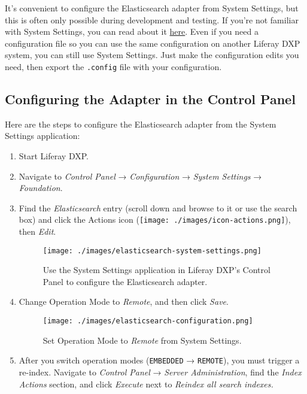 It's convenient to configure the Elasticsearch adapter from System
Settings, but this is often only possible during development and
testing. If you're not familiar with System Settings, you can read about
it \href{/docs/7-0/user/-/knowledge_base/u/system-settings}{here}. Even
if you need a configuration file so you can use the same configuration
on another Liferay DXP system, you can still use System Settings. Just
make the configuration edits you need, then export the \texttt{.config}
file with your configuration.

\subsection{Configuring the Adapter in the Control
Panel}\label{configuring-the-adapter-in-the-control-panel}

Here are the steps to configure the Elasticsearch adapter from the
System Settings application:

\begin{enumerate}
\def\labelenumi{\arabic{enumi}.}
\item
  Start Liferay DXP.
\item
  Navigate to \emph{Control Panel} → \emph{Configuration} → \emph{System
  Settings} → \emph{Foundation}.
\item
  Find the \emph{Elasticsearch} entry (scroll down and browse to it or
  use the search box) and click the Actions icon
  (\texttt{[image: ./images/icon-actions.png]}), then \emph{Edit}.

  \begin{figure}
  \centering
  \texttt{[image: ./images/elasticsearch-system-settings.png]}
  \caption{Use the System Settings application in Liferay DXP's Control
  Panel to configure the Elasticsearch adapter.}
  \end{figure}
\item
  Change Operation Mode to \emph{Remote}, and then click \emph{Save}.

  \begin{figure}
  \centering
  \texttt{[image: ./images/elasticsearch-configuration.png]}
  \caption{Set Operation Mode to \emph{Remote} from System Settings.}
  \end{figure}
\item
  After you switch operation modes (\texttt{EMBEDDED} →
  \texttt{REMOTE}), you must trigger a re-index. Navigate to
  \emph{Control Panel} → \emph{Server Administration}, find the
  \emph{Index Actions} section, and click \emph{Execute} next to
  \emph{Reindex all search indexes.}
\end{enumerate}

